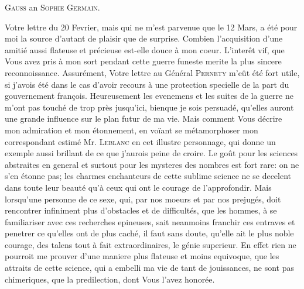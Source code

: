 \NoSourceHead
{}
\begin{center}\large\textsc{Gauss} an \textsc{Sophie Germain}.\end{center}
\par\indent Votre lettre du 20 Fevrier, mais qui ne m’est parvenue que le 12 Mars,
a été pour moi la source d’autant de plaisir que de surprise. Combien l’acquisition
d’une amitié aussi flateuse et précieuse est-elle douce à mon coeur.
L’interêt vif, que Vous avez pris à mon sort pendant cette guerre funeste merite
la plus sincere reconnoissance. Assurément, Votre lettre au Général
\textsc{Pernety} m’eût été fort utile, si j’avois été dans le cas d’avoir recours à une
protection specielle de la part du gouvernement françois. Heureusement les
evenemens et les suites de la guerre ne m’ont pas touché de trop près jusqu’ici,
bienque je sois persuadé, qu’elles auront une grande influence sur le plan futur
de ma vie. Mais comment Vous décrire mon admiration et mon étonnement,
en voïant se métamorphoser mon correspondant estimé Mr. \textsc{Leblanc} en cet
illustre personnage, qui donne un exemple aussi brillant de ce que j’aurois
peine de croire. Le goût pour les sciences abstraites en general et surtout
pour les mysteres des nombres est fort rare: on ne s’en étonne pas; les charmes
enchanteurs de cette sublime science ne se decelent dans toute leur beauté
qu’à ceux qui ont le courage de l’approfondir. Mais lorsqu’une personne de
ce sexe, qui, par nos moeurs et par nos prejugés, doit rencontrer infiniment
plus d’obstacles et de difficultés, que les hommes, à se familiariser avec ces
recherches epineuses, sait neanmoins franchir ces entraves et penetrer ce
qu’elles ont de plus caché, il faut sans doute, qu’elle ait le plus noble courage,
des talens tout à fait extraordinaires, le génie superieur. En effet rien
ne pourroit me prouver d’une maniere plus flateuse et moins equivoque, que
\clearpage
{}
\noindent les attraits de cette science, qui a embelli ma vie de tant de jouissances, ne
sont pas chimeriques, que la predilection, dont Vous l’avez honorée.

